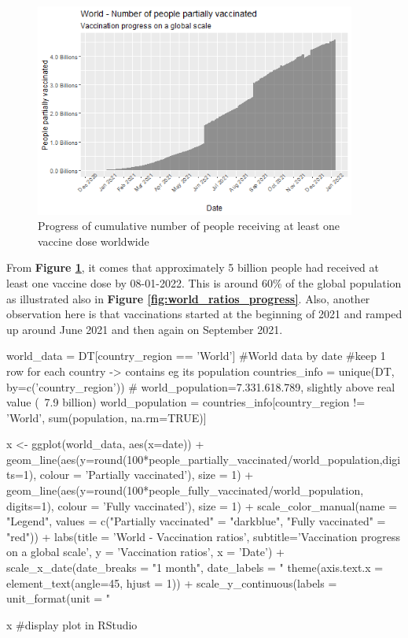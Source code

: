 \begin{figure}[h]
    \centering
    \includegraphics[height=7cm]{figures/World-people partially vaccinated progress over time.png}
    \caption{Progress of cumulative number of people receiving at least one vaccine dose worldwide}
    \label{fig:world_people_progress}
\end{figure}
\FloatBarrier %

From \textbf{Figure \ref{fig:world_people_progress}}, it comes that approximately 5 billion people had received at least one vaccine dose by 08-01-2022. This is around 60\% of the global population as illustrated also in \textbf{Figure \ref{fig:world_ratios_progress}}.
Also, another observation here is that vaccinations started at the beginning of 2021 and ramped up around June 2021 and then again on September 2021.

\begin{Rcode}{\scriptsize}
world_data = DT[country_region == 'World'] #World data by date
#keep 1 row for each country -> contains eg its population
countries_info = unique(DT, by=c('country_region')) 
# world\_population=7.331.618.789, slightly above real value (~7.9 billion)
world_population = countries_info[country_region != 'World', 
                                sum(population, na.rm=TRUE)] 

x <- ggplot(world_data, aes(x=date)) +
  geom_line(aes(y=round(100*people_partially_vaccinated/world_population,digits=1), 
                colour = 'Partially vaccinated'), size = 1) +
  geom_line(aes(y=round(100*people_fully_vaccinated/world_population, digits=1), 
                colour = 'Fully vaccinated'), size = 1) +
  scale_color_manual(name = "Legend", 
                     values = c("Partially vaccinated" = "darkblue", 
                     "Fully vaccinated" = "red")) +
  labs(title = 'World - Vaccination ratios',
       subtitle='Vaccination progress on a global scale',
       y = 'Vaccination ratios',
       x = 'Date') +
  scale_x_date(date_breaks = "1 month", date_labels = "%
  theme(axis.text.x = element_text(angle=45, hjust = 1)) +
  scale_y_continuous(labels = unit_format(unit = "%

x #display plot in RStudio
\end{Rcode}

